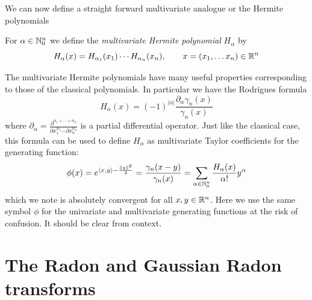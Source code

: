 We can now define a straight forward multivariate analogue or the 
Hermite polynomials 

\begin{definition}
  For $\alpha \in \mathbb{N}_0^n$ we define the \emph{multivariate Hermite polynomial} $H_\alpha$ by
\[
  H_{\alpha}(x) = H_{\alpha_1}(x_1) \cdots H_{\alpha_n}(x_n), \qquad x = (x_1, \ldots x_n) \in \mathbb{R}^n 
\]
\end{definition}

The multivariate Hermite polynomials have many useful properties corresponding to those of the classical polynomials. In particular we have the Rodrigues formula
\[
  H_\alpha(x) 
    = (-1)^{|\alpha|}\frac{\partial_{\alpha}\gamma_n(x)}{\gamma_n(x)}
\]
where $\partial_\alpha = \frac{\partial^{\alpha_1 + \cdots + \alpha_n}}{\partial x_1^{\alpha_1} \cdots \partial x_n^{\alpha_n}}$ is a partial differential operator. Just like the classical case, this formula can be used to define $H_\alpha$ as multivariate Taylor coefficients for the generating function:
\[
  \phi(x) = e^{\langle x, y\rangle - \frac{\|y\|^2}2} 
    = \frac{\gamma_n(x - y)}{\gamma_n(x)} 
      = \sum_{\alpha \in \mathbb{N}_0^n} \frac{H_\alpha(x)}{\alpha!}y^\alpha
\]
which we note is absolutely convergent for all $x, y \in \mathbb{R}^n$. Here we use the same symbol $\phi$ for the univariate and multivariate generating functions at the risk of confusion. It should be clear from context.






\section{The Radon and Gaussian Radon transforms}\label{sec:RTGRT}

